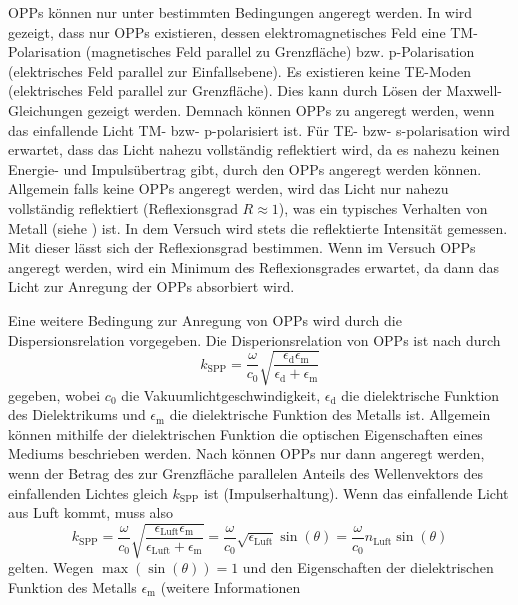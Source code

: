 OPPs können nur unter bestimmten Bedingungen angeregt werden. In \cite{nano} wird gezeigt, dass nur OPPs existieren, dessen elektromagnetisches Feld eine TM-Polarisation (magnetisches Feld
parallel zu Grenzfläche) bzw. p-Polarisation (elektrisches Feld parallel zur Einfallsebene). Es existieren keine TE-Moden (elektrisches Feld parallel zur Grenzfläche).
Dies kann durch Lösen der Maxwell-Gleichungen gezeigt werden. Demnach können OPPs zu angeregt werden, wenn das einfallende Licht TM- bzw- p-polarisiert ist. Für
TE- bzw- s-polarisation wird erwartet, dass das Licht nahezu vollständig reflektiert wird, da es nahezu keinen Energie- und Impulsübertrag gibt, durch den OPPs
angeregt werden können. Allgemein falls keine OPPs angeregt werden, wird das Licht nur nahezu vollständig reflektiert (Reflexionsgrad $R \approx 1$), was ein typisches
Verhalten von Metall (siehe \cite{linden_optik}) ist. In dem Versuch wird stets die reflektierte Intensität gemessen. Mit dieser lässt sich der Reflexionsgrad bestimmen.
Wenn im Versuch OPPs angeregt werden, wird ein Minimum des Reflexionsgrades erwartet, da dann das Licht zur Anregung der OPPs absorbiert wird.\par
Eine weitere Bedingung zur Anregung von OPPs wird durch die Dispersionsrelation vorgegeben. Die Disperionsrelation von OPPs ist nach \cite{linden_optik} durch
\begin{equation}\label{eq:k_spp}
    k_{\mathrm{SPP}} = \frac{\omega}{c_0} \sqrt{\frac{\epsilon_{\mathrm{d}}\epsilon_{\mathrm{m}}}{\epsilon_{\mathrm{d}} + \epsilon_{\mathrm{m}}}}
\end{equation} gegeben, wobei $c_0$ die Vakuumlichtgeschwindigkeit, $\epsilon_{\mathrm{d}}$ die dielektrische Funktion des Dielektrikums und $\epsilon_{\mathrm{m}}$
die dielektrische Funktion des Metalls ist. Allgemein können mithilfe der dielektrischen Funktion die optischen Eigenschaften eines Mediums beschrieben werden.
Nach \cite{linden_photonics} können OPPs nur dann angeregt werden, wenn der Betrag des zur Grenzfläche parallelen Anteils des Wellenvektors des einfallenden Lichtes
gleich $k_{\mathrm{SPP}}$ ist (Impulserhaltung). Wenn das einfallende Licht aus Luft kommt, muss also
\begin{equation*}
    k_{\mathrm{SPP}} = \frac{\omega}{c_0}\sqrt{\frac{\epsilon_{\mathrm{Luft}}\epsilon_{\mathrm{m}}}{\epsilon_{\mathrm{Luft}} + \epsilon_{\mathrm{m}}}} = \frac{\omega}{c_0}\sqrt{\epsilon_{\mathrm{Luft}}} \sin(\theta) = \frac{\omega}{c_0}n_{\mathrm{Luft}} \sin(\theta)
\end{equation*} gelten. Wegen $\max(\sin(\theta)) = 1$ und den Eigenschaften der dielektrischen Funktion des Metalls $\epsilon_{\mathrm{m}}$ (weitere Informationen
